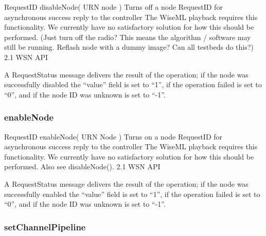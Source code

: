 \begin{apidoc}
	{RequestID disableNode( URN node )} %
	{Turns off a node} %
	{
	} %
	{RequestID for asynchronous success reply to the controller} %
	{The WiseML playback requires this functionality. We currently have no satisfactory solution for how this should be performed. (Just turn off the radio? This means the algorithm / software may still be running. Reflash node with a dummy image? Can all testbeds do this?)} %
	{2.1 WSN API} %
\end{apidoc}

A RequestStatus message delivers the result of the operation; if the node was successfully disabled the ``value'' field is set to ``1'', if the operation failed is set to ``0'', and if the node ID was unknown is set to ``-1''.

			\subsubsection{enableNode}


\begin{apidoc}
	{RequestID enableNode( URN Node )} %
	{Turns on a node} %
	{
	} %
	{RequestID for asynchronous success reply to the controller} %
	{The WiseML playback requires this functionality. We currently have no satisfactory solution for how this should be performed. Also see disableNode().} %
	{2.1 WSN API} %
\end{apidoc}

A RequestStatus message delivers the result of the operation; if the node was successfully enabled the ``value'' field is set to ``1'', if the operation failed is set to ``0'', and if the node ID was unknown is set to ``-1''.


			\subsubsection{setChannelPipeline}


